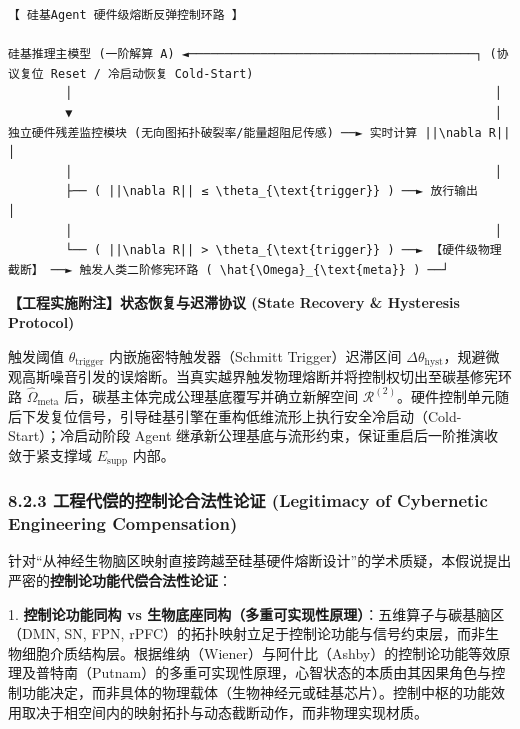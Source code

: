 \documentclass[11pt,a4paper,oneside]{ctexart}
\begin{document}
\begin{tcolorbox}[colback=gray!5!white,colframe=gray!50!black,fontupper=\ttfamily\small]
\begin{verbatim}
【 硅基Agent 硬件级熔断反弹控制环路 】

硅基推理主模型 (一阶解算 A) ◄────────────────────────────────────────┐ (协议复位 Reset / 冷启动恢复 Cold-Start)
        │                                                           │
        ▼                                                           │
独立硬件残差监控模块 (无向图拓扑破裂率/能量超阻尼传感) ──► 实时计算 ||\nabla R|| │
        │                                                           │
        ├── ( ||\nabla R|| ≤ \theta_{\text{trigger}} ) ──► 放行输出                      │
        │                                                           │
        └── ( ||\nabla R|| > \theta_{\text{trigger}} ) ──► 【硬件级物理截断】 ──► 触发人类二阶修宪环路 ( \hat{\Omega}_{\text{meta}} ) ──┘
\end{verbatim}
\end{tcolorbox}

\begin{notebox}
\textbf{【工程实施附注】状态恢复与迟滞协议 (State Recovery \& Hysteresis Protocol)}

触发阈值 $\theta_{\text{trigger}}$ 内嵌施密特触发器（Schmitt Trigger）迟滞区间 $\Delta \theta_{\text{hyst}}$，规避微观高斯噪音引发的误熔断。当真实越界触发物理熔断并将控制权切出至碳基修宪环路 $\hat{\Omega}_{\text{meta}}$ 后，碳基主体完成公理基底覆写并确立新解空间 $\mathcal{R}^{(2)}$。硬件控制单元随后下发复位信号，引导硅基引擎在重构低维流形上执行安全冷启动（Cold-Start）；冷启动阶段 Agent 继承新公理基底与流形约束，保证重启后一阶推演收敛于紧支撑域 $E_{\text{supp}}$ 内部。
\end{notebox}

\subsubsection{8.2.3 工程代偿的控制论合法性论证 (Legitimacy of Cybernetic Engineering Compensation)}

针对“从神经生物脑区映射直接跨越至硅基硬件熔断设计”的学术质疑，本假说提出严密的\textbf{控制论功能代偿合法性论证}：


1. \textbf{控制论功能同构 vs 生物底座同构（多重可实现性原理）}：五维算子与碳基脑区（DMN, SN, FPN, rPFC）的拓扑映射立足于控制论功能与信号约束层，而非生物细胞介质结构层。根据维纳（Wiener）与阿什比（Ashby）的控制论功能等效原理及普特南（Putnam）的多重可实现性原理，心智状态的本质由其因果角色与控制功能决定，而非具体的物理载体（生物神经元或硅基芯片）。控制中枢的功能效用取决于相空间内的映射拓扑与动态截断动作，而非物理实现材质。
\end{document}
